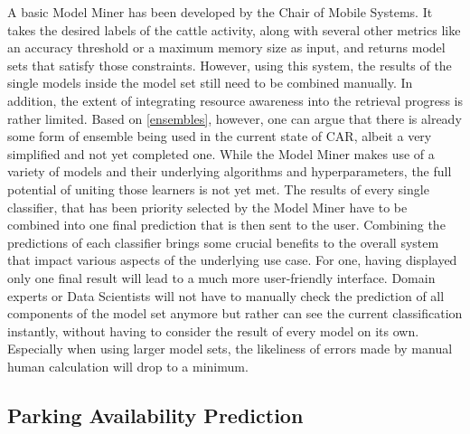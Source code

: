 A basic Model Miner has been developed by the Chair of Mobile Systems. It takes the desired labels of the cattle activity, along with several other metrics like an accuracy threshold or a maximum memory size as input, and returns model sets that satisfy those constraints. However, using this system, the results of the single models inside the model set still need to be combined manually. In addition, the extent of integrating resource awareness into the retrieval progress is rather limited. Based on \autoref{ensembles}, however, one can argue that there is already some form of ensemble being used in the current state of CAR, albeit a very simplified and not yet completed one. While the Model Miner makes use of a variety of models and their underlying algorithms and hyperparameters, the full potential of uniting those learners is not yet met. The results of every single classifier, that has been priority selected by the Model Miner have to be combined into one final prediction that is then sent to the user. Combining the predictions of each classifier brings some crucial benefits to the overall system that impact various aspects of the underlying use case. For one, having displayed only one final result will lead to a much more user-friendly interface. Domain experts or Data Scientists will not have to manually check the prediction of all components of the model set anymore but rather can see the current classification instantly, without having to consider the result of every model on its own. Especially when using larger model sets, the likeliness of errors made by manual human calculation will drop to a minimum. 


\subsection{Parking Availability Prediction}

